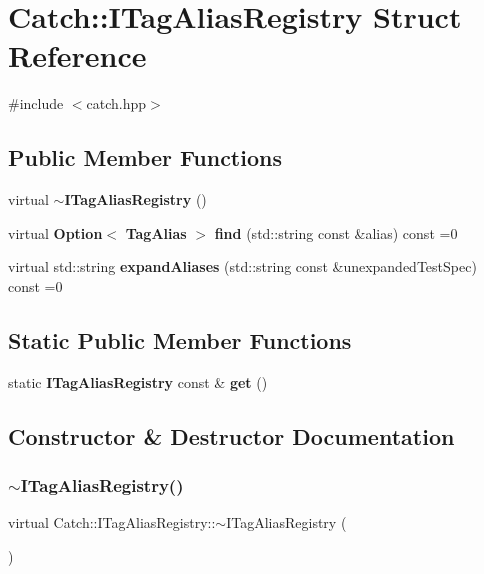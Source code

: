 \section{Catch\+:\+:I\+Tag\+Alias\+Registry Struct Reference}
\label{struct_catch_1_1_i_tag_alias_registry}


{\ttfamily \#include $<$catch.\+hpp$>$}

\subsection*{Public Member Functions}
\begin{DoxyCompactItemize}
\item 
virtual \textbf{ $\sim$\+I\+Tag\+Alias\+Registry} ()
\item 
virtual \textbf{ Option}$<$ \textbf{ Tag\+Alias} $>$ \textbf{ find} (std\+::string const \&alias) const =0
\item 
virtual std\+::string \textbf{ expand\+Aliases} (std\+::string const \&unexpanded\+Test\+Spec) const =0
\end{DoxyCompactItemize}
\subsection*{Static Public Member Functions}
\begin{DoxyCompactItemize}
\item 
static \textbf{ I\+Tag\+Alias\+Registry} const  \& \textbf{ get} ()
\end{DoxyCompactItemize}


\subsection{Constructor \& Destructor Documentation}
\mbox{\label{struct_catch_1_1_i_tag_alias_registry_a8967db4dd40b68e22697eff0f4928239}} 
\subsubsection{$\sim$\+I\+Tag\+Alias\+Registry()}
{\footnotesize\ttfamily virtual Catch\+::\+I\+Tag\+Alias\+Registry\+::$\sim$\+I\+Tag\+Alias\+Registry (\begin{DoxyParamCaption}{ }\end{DoxyParamCaption})\hspace{0.3cm}{\ttfamily [virtual]}}



